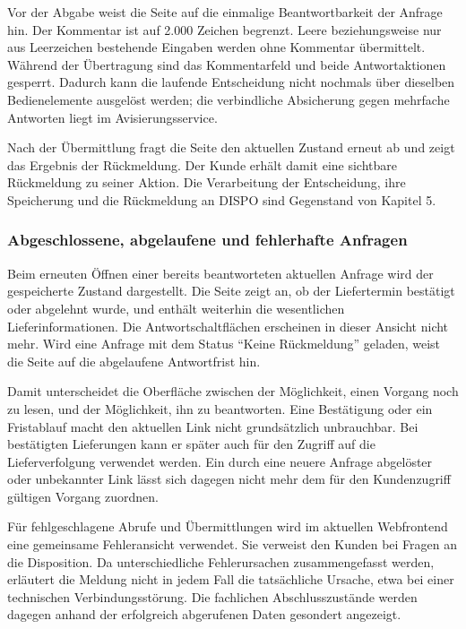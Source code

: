 Vor der Abgabe weist die Seite auf die einmalige Beantwortbarkeit der Anfrage hin. Der
Kommentar ist auf 2.000 Zeichen begrenzt. Leere beziehungsweise nur aus Leerzeichen bestehende
Eingaben werden ohne Kommentar übermittelt. Während der Übertragung sind das Kommentarfeld und
beide Antwortaktionen gesperrt. Dadurch kann die laufende Entscheidung nicht nochmals über
dieselben Bedienelemente ausgelöst werden; die verbindliche Absicherung gegen mehrfache
Antworten liegt im Avisierungsservice.

Nach der Übermittlung fragt die Seite den aktuellen Zustand erneut ab und zeigt das Ergebnis
der Rückmeldung. Der Kunde erhält damit eine sichtbare Rückmeldung zu seiner Aktion. Die
Verarbeitung der Entscheidung, ihre Speicherung und die Rückmeldung an DISPO sind Gegenstand
von Kapitel 5.

\subsubsection{Abgeschlossene, abgelaufene und fehlerhafte Anfragen}

Beim erneuten Öffnen einer bereits beantworteten aktuellen Anfrage wird der gespeicherte
Zustand dargestellt. Die Seite zeigt an, ob der Liefertermin bestätigt oder abgelehnt wurde,
und enthält weiterhin die wesentlichen Lieferinformationen. Die Antwortschaltflächen erscheinen
in dieser Ansicht nicht mehr. Wird eine Anfrage mit dem Status \enquote{Keine Rückmeldung}
geladen, weist die Seite auf die abgelaufene Antwortfrist hin.

Damit unterscheidet die Oberfläche zwischen der Möglichkeit, einen Vorgang noch zu lesen, und
der Möglichkeit, ihn zu beantworten. Eine Bestätigung oder ein Fristablauf macht den aktuellen
Link nicht grundsätzlich unbrauchbar. Bei bestätigten Lieferungen kann er später auch für den
Zugriff auf die Lieferverfolgung verwendet werden. Ein durch eine neuere Anfrage abgelöster
oder unbekannter Link lässt sich dagegen nicht mehr dem für den Kundenzugriff gültigen Vorgang
zuordnen.

Für fehlgeschlagene Abrufe und Übermittlungen wird im aktuellen Webfrontend eine gemeinsame
Fehleransicht verwendet. Sie verweist den Kunden bei Fragen an die Disposition. Da
unterschiedliche Fehlerursachen zusammengefasst werden, erläutert die Meldung nicht in jedem
Fall die tatsächliche Ursache, etwa bei einer technischen Verbindungsstörung. Die fachlichen
Abschlusszustände werden dagegen anhand der erfolgreich abgerufenen Daten gesondert angezeigt.

